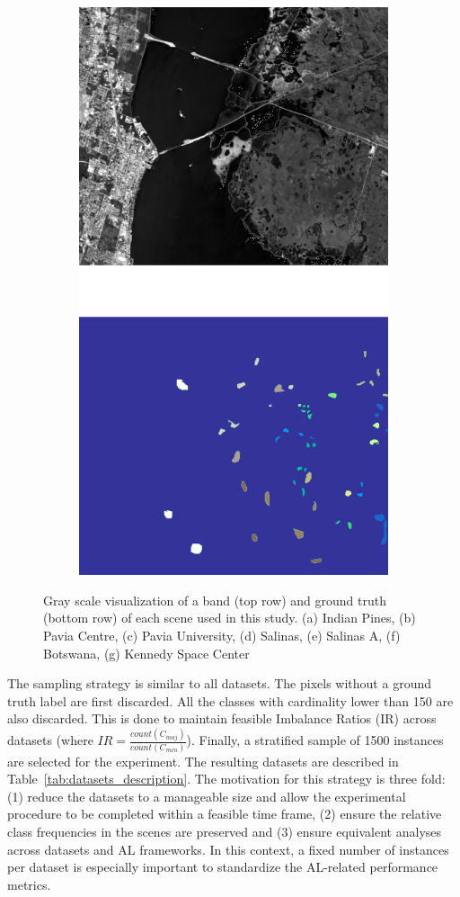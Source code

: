 \documentclass[preprint,12pt]{elsarticle}
\begin{document}
\begin{figure}[H]
\begin{subfigure}{.20\textwidth}
		\includegraphics[height=1.5\linewidth]{../analysis/kennedy_space_center}
		\subcaption{{\medbreak}}\label{fig:kennedy_space_center}
	\end{subfigure}
    \caption{Gray scale visualization of a band (top row) and ground truth
        (bottom row) of each scene used in this study. (a) Indian Pines, (b)
        Pavia Centre, (c) Pavia University, (d) Salinas, (e) Salinas A, (f)
        Botswana, (g) Kennedy Space Center }\label{fig:scenes}
\end{figure}

The sampling strategy is similar to all datasets. The pixels without a ground
truth label are first discarded. All the classes with cardinality lower than
150 are also discarded. This is done to maintain feasible Imbalance Ratios (IR)
across datasets (where $IR = \frac{count(C_{maj})}{count(C_{min})}$). Finally,
a stratified sample of 1500 instances are selected for the experiment. The
resulting datasets are described in Table~\ref{tab:datasets_description}. The
motivation for this strategy is three fold: (1) reduce the datasets to a
manageable size and allow the experimental procedure to be completed within a
feasible time frame, (2) ensure the relative class frequencies in the scenes
are preserved and (3) ensure equivalent analyses across datasets and AL
frameworks. In this context, a fixed number of instances per dataset is
especially important to standardize the AL-related performance metrics.
\end{document}
